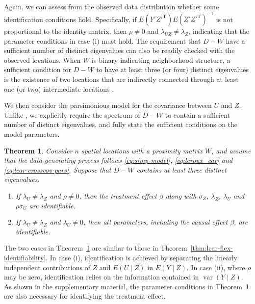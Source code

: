 \documentclass[11pt]{article}
\newtheorem{theorem}{Theorem}
\theoremstyle{definition}
\theoremstyle{remark}
\DeclareMathOperator{\var}{var}
\def\top{{ \mathrm{\scriptscriptstyle T} }}
\begin{document}
Again, we can assess from the observed data distribution whether some identification conditions hold. 
Specifically, if $E(Y'Z'^{\top})E(Z'Z'^{\top})^{-1}$ is not proportional to the identity matrix, 
then $\rho \neq 0$ and $\lambda_{UZ} \neq \lambda_Z$, 
indicating that the parameter conditions in case (i) must hold. 
The requirement 
that $D - W$ have a sufficient number of distinct eigenvalues 
can also be readily checked with the observed locations. 
When $W$ is binary indicating neighborhood structure, 
a sufficient condition for $D - W$ to have at least three (or four) distinct eigenvalues 
is the existence of two locations that are indirectly connected through at least one 
(or two) intermediate locations \citep[][Proposition~1.3.3]{brouwer2011spectra}.






We then consider the parsimonious model for the covariance between $U$ and $Z$. 
Unlike \citet{guan2023spectral}, 
we explicitly require the spectrum of $D - W$ to contain a sufficient number of distinct eigenvalues, 
and fully state the sufficient conditions on the model parameters.


\begin{theorem}\label{thm:lcar-pars-identifiability}
Consider $n$ spatial locations with a proximity matrix $W$, and assume that the data generating process follows \eqref{eq:simp-model}, \eqref{eq:leroux_car} and \eqref{eq:lcar-crosscov-pars}. Suppose that $D-W$ contains at least three distinct eigenvalues.
\begin{enumerate}[label=(\roman*), topsep=1ex,itemsep=-0.3ex,partopsep=1ex,parsep=1ex]
\item If $\lambda_U\neq \lambda_Z$ and $\rho \neq 0$, then the treatment effect $\beta$ along with $\sigma_Z$, $\lambda_Z$, $\lambda_U$ and $\rho \sigma_U$ are identifiable.
\item If $\lambda_U \neq \lambda_Z$ and $\lambda_U \neq 0$, then all parameters, including the causal effect $\beta$, are identifiable.
\end{enumerate}
\end{theorem}


The two cases in Theorem~\ref{thm:lcar-pars-identifiability} 
are similar to those in Theorem~\ref{thm:lcar-flex-identifiability}. 
In case (i), identification is achieved by separating the linearly independent contributions 
of $Z$ and $E(U \mid Z)$ in $E(Y \mid Z)$. 
In case (ii), where $\rho$ may be zero, 
identification relies on the information contained in $\var(Y \mid Z)$. 
As shown in the supplementary material, 
the parameter conditions in Theorem~\ref{thm:lcar-pars-identifiability} 
are also necessary for identifying the treatment effect. 
\end{document}
